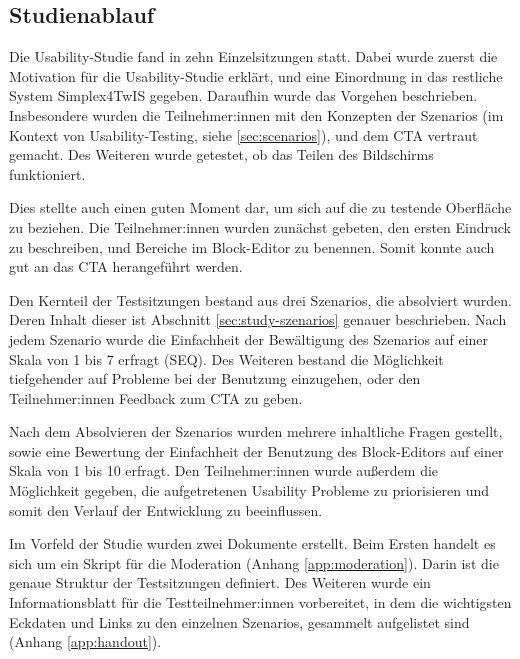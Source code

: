 \subsection{Studienablauf}

Die Usability-Studie fand in zehn Einzelsitzungen statt. Dabei wurde zuerst die Motivation für die Usability-Studie erklärt, und eine Einordnung in das restliche System Simplex4TwIS gegeben. Daraufhin wurde das Vorgehen beschrieben. Insbesondere wurden die Teilnehmer:innen mit den Konzepten der Szenarios (im Kontext von Usability-Testing, siehe \ref{sec:scenarios}), und dem \ac{CTA} vertraut gemacht. Des Weiteren wurde getestet, ob das Teilen des Bildschirms funktioniert.

Dies stellte auch einen guten Moment dar, um sich auf die zu testende Oberfläche zu beziehen. Die Teilnehmer:innen wurden zunächst gebeten, den ersten Eindruck zu beschreiben, und Bereiche im Block-Editor zu benennen. Somit konnte auch gut an das \ac{CTA} herangeführt werden.

Den Kernteil der Testsitzungen bestand aus drei Szenarios, die absolviert wurden. Deren Inhalt dieser ist Abschnitt \ref{sec:study-szenarios} genauer beschrieben. Nach jedem Szenario wurde die Einfachheit der Bewältigung des Szenarios auf einer Skala von 1 bis 7 erfragt (\ac{SEQ}). Des Weiteren bestand die Möglichkeit tiefgehender auf Probleme bei der Benutzung einzugehen, oder den Teilnehmer:innen Feedback zum \ac{CTA} zu geben.

Nach dem Absolvieren der Szenarios wurden mehrere inhaltliche Fragen gestellt, sowie eine Bewertung der Einfachheit der Benutzung des Block-Editors auf einer Skala von 1 bis 10 erfragt. Den Teilnehmer:innen wurde außerdem die Möglichkeit gegeben, die aufgetretenen Usability Probleme zu priorisieren und somit den Verlauf der Entwicklung zu beeinflussen.

Im Vorfeld der Studie wurden zwei Dokumente erstellt. Beim Ersten handelt es sich um ein Skript für die Moderation (Anhang \ref{app:moderation}). Darin ist die genaue Struktur der Testsitzungen definiert. Des Weiteren wurde ein Informationsblatt für die Testteilnehmer:innen vorbereitet, in dem die wichtigsten Eckdaten und Links zu den einzelnen Szenarios, gesammelt aufgelistet sind (Anhang \ref{app:handout}).
